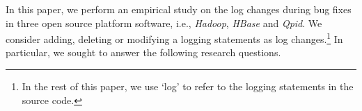 
%
%
%

In this paper, we perform an empirical study on the log changes during bug fixes in three open source platform software, i.e., \emph{Hadoop}, \emph{HBase} and \emph{Qpid}. We consider adding, deleting or modifying a logging statements as log changes.\footnote{In the rest of this paper, we use `log' to refer to the logging statements in the source code.} In particular, we sought to answer the following research questions. 


